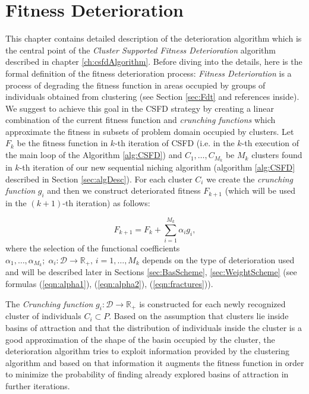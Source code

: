 

\chapter{Fitness Deterioration}
\label{ch:fitnessDet}

This chapter contains detailed description of the deterioration algorithm
which is the central point of the \textit{Cluster Supported Fitness
Deterioration} algorithm described in chapter \ref{ch:csfdAlgorithm}. 
Before diving into the details, here is the formal definition of the fitness
deterioration process:
\textit{Fitness Deterioration} is a process of degrading the fitness
function in areas occupied by groups of individuals obtained from
clustering (see Section \ref{sec:Fdt} and references inside). 
We suggest to achieve this goal in the CSFD strategy by creating a linear combination 
of the current fitness function and \textit{crunching functions} which approximate
the fitness in subsets of problem domain occupied by clusters.
Let $F_k$ be the fitness function in $k$-th iteration of CSFD
(i.e. in the $k$-th execution of the main loop of the Algorithm \ref{alg:CSFD})
and $C_1, \ldots, C_{M_k}$ be
$M_k$ clusters found in $k$-th iteration of our new sequential niching algorithm 
(algorithm \ref{alg:CSFD} described in Section \ref{sec:algDesc}).
For each cluster $C_i$ we create the \textit{crunching function} $g_i$ and then
we construct deteriorated fitness $F_{k+1}$ (which will be used in the
$(k+1)$-th iteration) as follows:

\begin{equation}
\label{eqn:fitDet}
F_{k+1} = F_k + \sum_{i=1}^{M_k} \alpha_i g_i,
\end{equation}
where the selection of the functional coefficients 
$\alpha_1, \ldots, \alpha_{M_k}; \; \alpha_i:\mathcal{D} \rightarrow \mathbb{R}_+, \,
i = 1, \ldots, M_k$ depends on the
type of deterioration used and will be described later in Sections
\ref{sec:BasScheme}, \ref{sec:WeightScheme}
(see formulas (\ref{eqn:alpha1}), (\ref{eqn:alpha2}), 
(\ref{eqn:fractures})).
 

The \textit{Crunching function} $g_i: \mathcal{D} \rightarrow \mathbb{R}_+$ 
is constructed for each newly recognized cluster of individuals
$C_i \subset P$.
Based on the assumption that clusters lie inside basins
of attraction and that the distribution of individuals inside the cluster
is a good approximation of the shape of the basin occupied by the cluster,
the deterioration algorithm tries to exploit information
provided by the clustering algorithm and based 
on that information it augments the fitness function in order to minimize 
the probability of finding already explored basins of attraction in further iterations.

